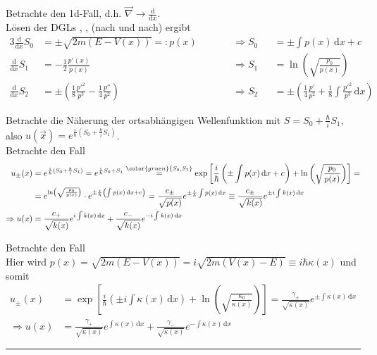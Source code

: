 \documentclass{article}
\newcommand{\diff}{\mathrm{d}}
\newcommand{\lr}[1]{\left(#1\right)}
\newcommand{\lreck}[1]{\left[#1\right]}
\newcommand{\comment}[1]{{\color{gruen} {#1}}}
\begin{document}
{	Betrachte den 1d-Fall, d.h. $\vec{\nabla}\to \frac{\diff}{\diff x}$.\\
	Lösen der DGLs , ,  (nach und nach) ergibt
		\begin{alignat*}{3}
			\frac{\diff}{\diff x} S_0 &= \pm\sqrt{2m(E-V(x))} =: p(x) \qquad && \Rightarrow S_0 &&= \pm\int p(x)\,\diff x + c \\
			\frac{\diff}{\diff x} S_1 &= -\frac{1}{2}\frac{p'(x)}{p(x)} \qquad && \Rightarrow S_1 &&= \ln\lr{\sqrt{\frac{p_0}{p(x)}}} \\
			\frac{\diff}{\diff x} S_2 &= \pm \lr{ \frac{1}{8}\frac{p'^2}{p^3} - \frac{1}{4}\frac{p''}{p^2}} && \Rightarrow S_2 &&= \pm \lr{ \frac{1}{4}\frac{p'}{p^2} + \frac{1}{8}\int\frac{p'^2}{p^3}\,\diff x}
		\end{alignat*}
	
	Betrachte die Näherung der ortsabhängigen Wellenfunktion mit $S = S_0 + \frac{\hbar}{i}S_1$, also $u(\vec{x}) = e^{\frac{i}{\hbar}(S_0 + \frac{\hbar}{i}S_1)}$.\\
	Betrachte den Fall 
		\begin{align*}
			u_\pm(x) &= e^{\frac{i}{\hbar}(S_0 + \frac{\hbar}{i}S_1)} = e^{\frac{i}{\hbar}S_0 + S_1} \stackrel{\comment{S_0, S_1}}{=} \exp\lreck{ \frac{i}{\hbar} \lr{\pm\int p(x)\,\diff x + c} + \ln\lr{\sqrt{\frac{p_0}{p(x)}}} } = \\
			&= e^{\ln\lr{\sqrt{\frac{p_0}{p(x)}}}} \cdot e^{ \pm \frac{i}{\hbar} \lr{\int p(x)\,\diff x + c} } = \frac{c_\pm}{\sqrt{p(x)}} e^{\pm \frac{i}{\hbar}\int p(x)\,\diff x} \equiv \frac{c_\pm}{\sqrt{k(x)}} e^{\pm i\int k(x)\,\diff x} \\
			\Rightarrow u(x) &= \frac{c_+}{\sqrt{k(x)}} e^{ i\int k(x)\,\diff x} + \frac{c_-}{\sqrt{k(x)}} e^{- i\int k(x)\,\diff x}
		\end{align*}

	Betrachte den Fall \\
	Hier wird $p(x) = \sqrt{2m(E-V(x))} = i\sqrt{2m(V(x)-E)} \equiv i\hbar\kappa(x)$ und somit
		\begin{align*}
			u_\pm(x) &= \exp\lreck{ \frac{i}{\hbar}\lr{ \pm i\int \kappa(x)\,\diff x } + \ln\lr{\sqrt{\frac{\kappa_0}{\kappa(x)}}} } = \frac{\gamma_\pm}{\sqrt{\kappa(x)}} e^{\pm \int\kappa(x)\,\diff x} \\
	\Rightarrow u(x) &= \frac{\gamma_+}{\sqrt{\kappa(x)}} e^{\int\kappa(x)\,\diff x} + \frac{\gamma_-}{\sqrt{\kappa(x)}}e^{-\int\kappa(x)\,\diff x}
		\end{align*}
		

\hrule
}
\end{document}
